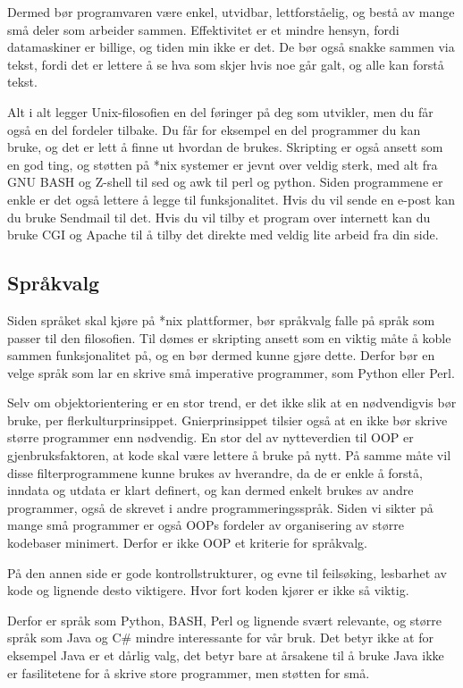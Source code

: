 \documentclass[11pt]{article}
\begin{document}
Dermed bør programvaren være enkel, utvidbar, lettforståelig, og bestå av mange små deler som arbeider sammen.
Effektivitet er et mindre hensyn, fordi datamaskiner er billige, og tiden min ikke er det.
De bør også snakke sammen via tekst, fordi det er lettere å se hva som skjer hvis noe går galt, og alle kan forstå tekst.

Alt i alt legger Unix-filosofien en del føringer på deg som utvikler, men du får også en del fordeler tilbake. Du får for eksempel en del programmer du kan bruke, og det er lett å finne ut hvordan de brukes.
Skripting er også ansett som en god ting, og støtten på *nix systemer er jevnt over veldig sterk, med alt fra GNU BASH og Z-shell til sed  og awk til perl og python.
Siden programmene er enkle er det også lettere å legge til funksjonalitet. Hvis du vil sende en e-post kan du bruke Sendmail til det. Hvis du vil tilby et program over internett kan du bruke CGI og Apache til å tilby det direkte med veldig lite arbeid fra din side.

\subsection{Språkvalg}
Siden språket skal kjøre på *nix plattformer, bør språkvalg falle på språk som passer til den filosofien.
Til dømes er skripting ansett som en viktig måte å koble sammen funksjonalitet på, og en bør dermed kunne gjøre dette.
Derfor bør en velge språk som lar en skrive små imperative programmer, som Python eller Perl.

Selv om objektorientering er en stor trend, er det ikke slik at en nødvendigvis bør bruke, per flerkulturprinsippet.
Gnierprinsippet tilsier også at en ikke bør skrive større programmer enn nødvendig.
En stor del av nytteverdien til OOP er gjenbruksfaktoren, at kode skal være lettere å bruke på nytt. På samme måte vil disse filterprogrammene kunne brukes av hverandre, da de er enkle å forstå, inndata og utdata er klart definert, og kan dermed enkelt brukes av andre programmer, også de skrevet i andre programmeringsspråk. Siden vi sikter på mange små programmer er også OOPs fordeler av organisering av større kodebaser minimert.
Derfor er ikke OOP et kriterie for språkvalg.

På den annen side er gode kontrollstrukturer, og evne til feilsøking, lesbarhet av kode og lignende desto viktigere. Hvor fort koden kjører er ikke så viktig.

Derfor er språk som Python, BASH, Perl og lignende svært relevante, og større språk som Java og C\# mindre interessante for vår bruk.
Det betyr ikke at for eksempel Java er et dårlig valg, det betyr bare at årsakene til å bruke Java ikke er fasilitetene for å skrive store programmer, men støtten for små.
\end{document}
